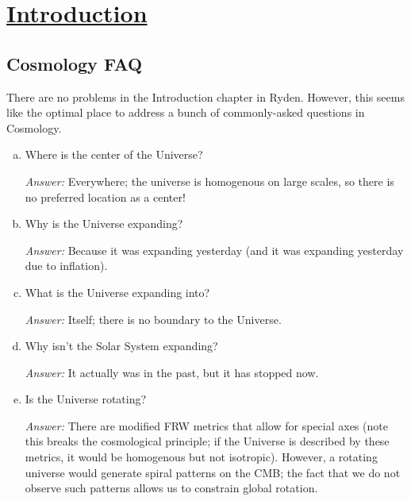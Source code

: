 \section[Introduction]{\hyperlink{toc}{Introduction}}
\subsection*{Cosmology FAQ}
There are no problems in the Introduction chapter in Ryden. However, this seems like the optimal place to address a bunch of commonly-asked questions in Cosmology.
\begin{enumerate}[(a)]
  \item Where is the center of the Universe?

  \textit{Answer:} Everywhere; the universe is homogenous on large scales, so there is no preferred location as a center!

  \item Why is the Universe expanding?

  \textit{Answer:} Because it was expanding yesterday (and it was expanding yesterday due to inflation).

  \item What is the Universe expanding into?

  \textit{Answer:} Itself; there is no boundary to the Universe. 


  \item Why isn't the Solar System expanding?

  \textit{Answer:} It actually was in the past, but it has stopped now.

  \item Is the Universe rotating?

  \textit{Answer:} There are modified FRW metrics that allow for special axes (note this breaks the cosmological principle; if the Universe is described by these metrics, it would be homogenous but not isotropic). However, a rotating universe would generate spiral patterns on the CMB; the fact that we do not observe such patterns allows us to constrain global rotation.


\end{enumerate}
